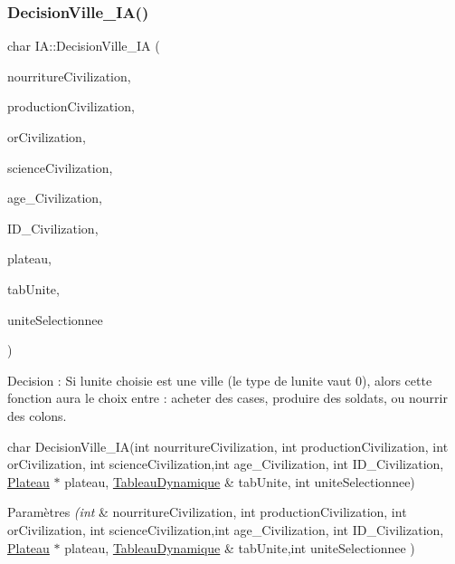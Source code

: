 \subsubsection{\texorpdfstring{Decision\+Ville\+\_\+\+I\+A()}{DecisionVille\_IA()}}
{\footnotesize\ttfamily char I\+A\+::\+Decision\+Ville\+\_\+\+IA (\begin{DoxyParamCaption}\item[{int}]{nourriture\+Civilization,  }\item[{int}]{production\+Civilization,  }\item[{int}]{or\+Civilization,  }\item[{int}]{science\+Civilization,  }\item[{int}]{age\+\_\+\+Civilization,  }\item[{int}]{I\+D\+\_\+\+Civilization,  }\item[{\hyperlink{classPlateau}{Plateau} $\ast$}]{plateau,  }\item[{\hyperlink{classTableauDynamique}{Tableau\+Dynamique} \&}]{tab\+Unite,  }\item[{int}]{unite\+Selectionnee }\end{DoxyParamCaption})}



Decision \+: Si l\textquotesingle{}unite choisie est une ville (le type de l\textquotesingle{}unite vaut 0), alors cette fonction aura le choix entre \+: acheter des cases, produire des soldats, ou nourrir des colons. 

char Decision\+Ville\+\_\+\+IA(int nourriture\+Civilization, int production\+Civilization, int or\+Civilization, int science\+Civilization,int age\+\_\+\+Civilization, int I\+D\+\_\+\+Civilization, \hyperlink{classPlateau}{Plateau} $\ast$ plateau, \hyperlink{classTableauDynamique}{Tableau\+Dynamique} \& tab\+Unite, int unite\+Selectionnee) 
\begin{DoxyParams}{Paramètres}
{\em (int} & nourriture\+Civilization, int production\+Civilization, int or\+Civilization, int science\+Civilization,int age\+\_\+\+Civilization, int I\+D\+\_\+\+Civilization, \hyperlink{classPlateau}{Plateau} $\ast$ plateau, \hyperlink{classTableauDynamique}{Tableau\+Dynamique} \& tab\+Unite,int unite\+Selectionnee ) \\
\hline
\end{DoxyParams}
\mbox{\label{classIA_ae7743e41d836107d2e1cd1df6416ccd3}} 
